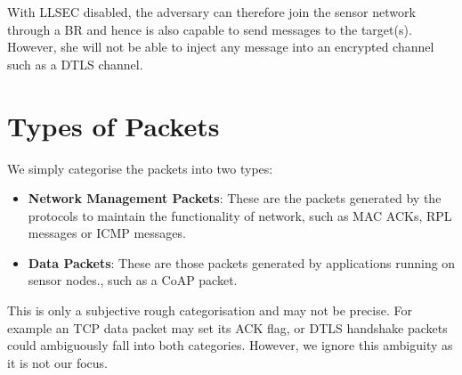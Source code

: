 With LLSEC disabled, the adversary can therefore join the sensor network through a BR and hence is also capable to send messages to the target(s). However, she will not be able to inject any message into an encrypted channel such as a DTLS channel.

\section{Types of Packets}
We simply categorise the packets into two types:
\begin{itemize}
\item {\bf Network Management Packets}: These are the packets generated by the protocols to  maintain the functionality of network, such as MAC ACKs, RPL messages or ICMP messages.
\item {\bf Data Packets}: These are those packets generated by applications running on sensor nodes., such as a CoAP packet.
\end{itemize}

This is only a subjective rough categorisation and may not be precise. For example an TCP data packet may set its ACK flag, or DTLS handshake packets could ambiguously fall into both categories. However, we ignore this ambiguity as it is not our focus.